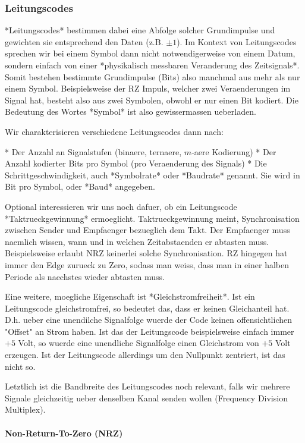 \subsubsection{ Leitungscodes}

*Leitungscodes* bestimmen dabei eine Abfolge solcher Grundimpulse und gewichten sie entsprechend den Daten (z.B. $\pm 1$). Im Kontext von Leitungscodes sprechen wir bei einem Symbol dann nicht notwendigerweise von einem Datum, sondern einfach von einer *physikalisch messbaren Veranderung des Zeitsignals*. Somit bestehen bestimmte Grundimpulse (Bits) also manchmal aus mehr als nur einem Symbol. Beispielsweise der RZ Impuls, welcher zwei Veraenderungen im Signal hat, besteht also aus zwei Symbolen, obwohl er nur einen Bit kodiert. Die Bedeutung des Wortes *Symbol* ist also gewissermassen ueberladen.

Wir charakterisieren verschiedene Leitungscodes dann nach:

* Der Anzahl an Signalstufen (binaere, ternaere, $m$-aere Kodierung)
* Der Anzahl kodierter Bits pro Symbol (pro Veraenderung des Signals)
* Die Schrittgeschwindigkeit, auch *Symbolrate* oder *Baudrate* genannt. Sie wird in Bit pro Symbol, oder *Baud* angegeben.

Optional interessieren wir uns noch dafuer, ob ein Leitungscode *Taktrueckgewinnung* ermoeglicht. Taktrueckgewinnung meint, Synchronisation zwischen Sender und Empfaenger bezueglich dem Takt. Der Empfaenger muss naemlich wissen, wann und in welchen Zeitabstaenden er abtasten muss. Beispielsweise erlaubt NRZ keinerlei solche Synchronisation. RZ hingegen hat immer den Edge zurueck zu Zero, sodass man weiss, dass man in einer halben Periode als naechstes wieder abtasten muss.

Eine weitere, moegliche Eigenschaft ist *Gleichstromfreiheit*. Ist ein Leitungscode gleichstromfrei, so bedeutet das, dass er keinen Gleichanteil hat. D.h. ueber eine unendilche Signalfolge wuerde der Code keinen offensichtlichen "Offset" an Strom haben. Ist das der Leitungscode beispielsweise einfach immer $+5$ Volt, so wuerde eine unendliche Signalfolge einen Gleichstrom von $+5$ Volt erzeugen. Ist der Leitungscode allerdings um den Nullpunkt zentriert, ist das nicht so.

Letztlich ist die Bandbreite des Leitungscodes noch relevant, falls wir mehrere Signale gleichzeitig ueber denselben Kanal senden wollen (Frequency Division Multiplex).

\paragraph{ Non-Return-To-Zero (NRZ)}

